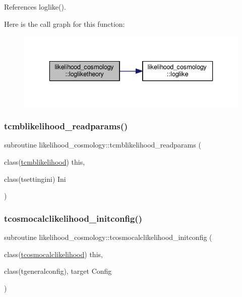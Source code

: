 References loglike().

Here is the call graph for this function\+:
\nopagebreak
\begin{figure}[H]
\begin{center}
\leavevmode
\includegraphics[width=336pt]{namespacelikelihood__cosmology_adfac1b06d8d335f24e427fe3629f706c_cgraph}
\end{center}
\end{figure}
\mbox{\label{namespacelikelihood__cosmology_a75d41b40f363669474961a1660570174}} 
\subsubsection{\texorpdfstring{tcmblikelihood\+\_\+readparams()}{tcmblikelihood\_readparams()}}
{\footnotesize\ttfamily subroutine likelihood\+\_\+cosmology\+::tcmblikelihood\+\_\+readparams (\begin{DoxyParamCaption}\item[{class(\mbox{\hyperlink{structlikelihood__cosmology_1_1tcmblikelihood}{tcmblikelihood}})}]{this,  }\item[{class(tsettingini)}]{Ini }\end{DoxyParamCaption})\hspace{0.3cm}{\ttfamily [private]}}

\mbox{\label{namespacelikelihood__cosmology_a75b0a523a1d5bbf9d32e34de5153ef36}} 
\subsubsection{\texorpdfstring{tcosmocalclikelihood\+\_\+initconfig()}{tcosmocalclikelihood\_initconfig()}}
{\footnotesize\ttfamily subroutine likelihood\+\_\+cosmology\+::tcosmocalclikelihood\+\_\+initconfig (\begin{DoxyParamCaption}\item[{class(\mbox{\hyperlink{structlikelihood__cosmology_1_1tcosmocalclikelihood}{tcosmocalclikelihood}})}]{this,  }\item[{class(tgeneralconfig), target}]{Config }\end{DoxyParamCaption})\hspace{0.3cm}{\ttfamily [private]}}


